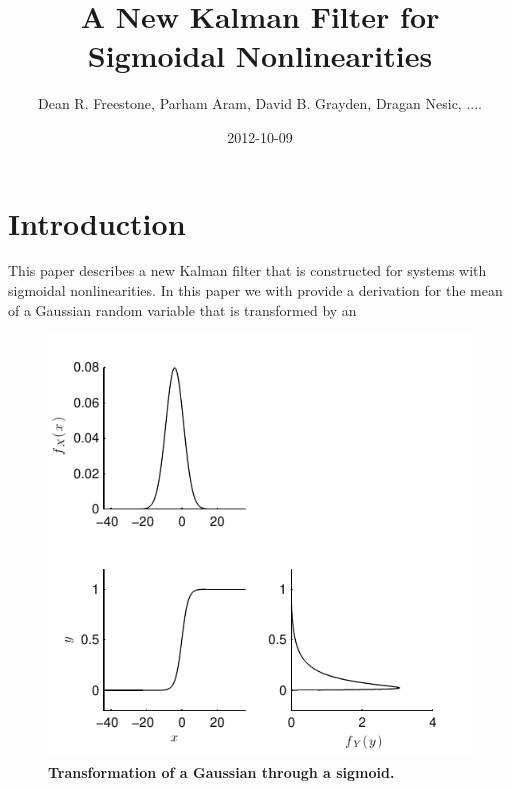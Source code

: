 \documentclass[]{article}
\title{A New Kalman Filter for Sigmoidal Nonlinearities}
\author{Dean R. Freestone, Parham Aram, David B. Grayden, Dragan Nesic, ....  }
\date{2012-10-09}
\begin{document}
\ifpdf
{}
\else
{}
\fi

\maketitle


\begin{abstract}
\end{abstract}

\section{Introduction}
This paper describes a new Kalman filter that is constructed for systems with sigmoidal nonlinearities. In this paper we with provide a derivation for the mean of a Gaussian random variable that is transformed by an 
\begin{figure}[!ht]
	\centering
		\includegraphics[scale=1]{./Figures/pdf/Mapping.pdf}
	\caption{\textbf{Transformation of a Gaussian through a sigmoid.}}
	\label{fig:label}
\end{figure}
\end{document}
